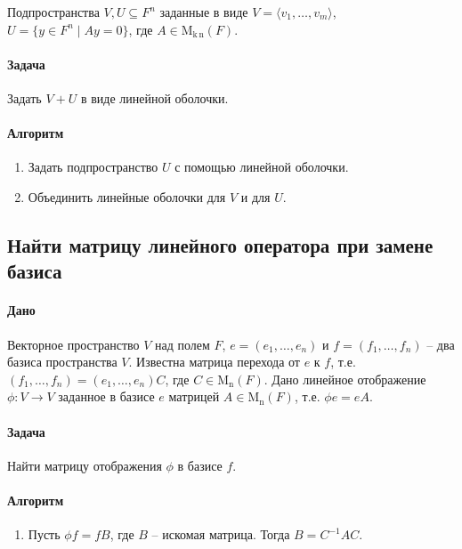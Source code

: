 \documentclass{article}
\newcommand{\MatrixDim}[3]{\operatorname{\mathrm{M}_{#2\,#3}}(#1)}
\newcommand{\Matrix}[2]{\operatorname{\mathrm{M}_{#2}}(#1)}
\begin{document}
Подпространства $V,U\subseteq F^{n}$ заданные в виде $V =\langle v_1,\ldots,v_m\rangle$, $U = \{y\in F^{n}\mid Ay = 0\}$, где $A\in \MatrixDim{F}{k}{n}$.

\paragraph{Задача}

Задать $V + U$ в виде линейной оболочки.

\paragraph{Алгоритм}
\begin{enumerate}
\item Задать подпространство $U$ с помощью линейной оболочки.

\item Объединить линейные оболочки для $V$ и для $U$.
\end{enumerate}



\subsection{Найти матрицу линейного оператора при замене базиса}

\paragraph{Дано} Векторное пространство $V$ над полем $F$, $e=(e_1,\ldots,e_n)$ и $f = (f_1,\ldots,f_n)$ -- два базиса пространства $V$. Известна матрица перехода от $e$ к $f$, т.е. $(f_1,\ldots,f_n) = (e_1,\ldots,e_n)C$, где $C\in \Matrix{F}{n}$. Дано линейное отображение $\phi\colon V\to V$ заданное в базисе $e$ матрицей $A\in\Matrix{F}{n}$, т.е. $\phi e = e A$.

\paragraph{Задача} Найти матрицу отображения $\phi$ в базисе $f$.

\paragraph{Алгоритм}
\begin{enumerate}
\item Пусть $\phi f = f B$, где $B$ -- искомая матрица. Тогда $B = C^{-1} A C$.
\end{enumerate}
\end{document}
